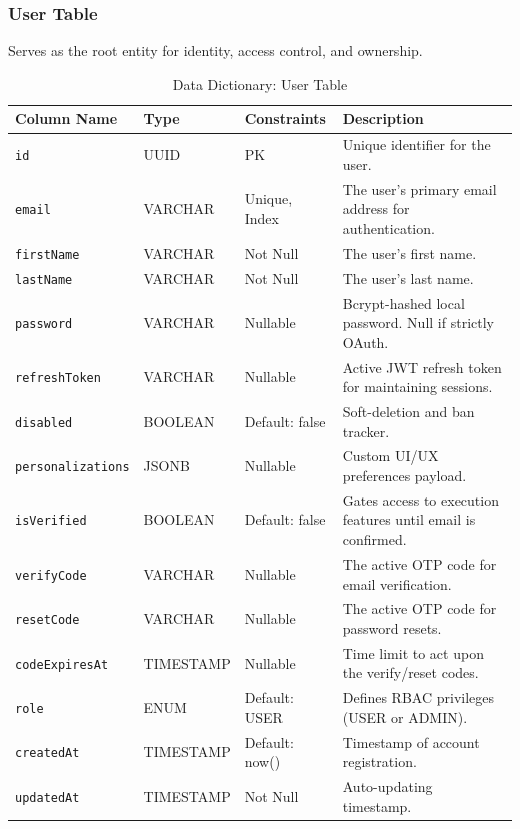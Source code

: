 \subsubsection{User Table}
Serves as the root entity for identity, access control, and ownership.
\begin{table}[H]
\centering
\renewcommand{\arraystretch}{1.3}
\begin{tabularx}{\textwidth}{|l|l|l|X|}
\hline
\textbf{Column Name} & \textbf{Type} & \textbf{Constraints} & \textbf{Description} \\
\hline
\texttt{id} & UUID & PK & Unique identifier for the user. \\
\hline
\texttt{email} & VARCHAR & Unique, Index & The user's primary email address for authentication. \\
\hline
\texttt{firstName} & VARCHAR & Not Null & The user's first name. \\
\hline
\texttt{lastName} & VARCHAR & Not Null & The user's last name. \\
\hline
\texttt{password} & VARCHAR & Nullable & Bcrypt-hashed local password. Null if strictly OAuth. \\
\hline
\texttt{refreshToken} & VARCHAR & Nullable & Active JWT refresh token for maintaining sessions. \\
\hline
\texttt{disabled} & BOOLEAN & Default: false & Soft-deletion and ban tracker. \\
\hline
\texttt{personalizations} & JSONB & Nullable & Custom UI/UX preferences payload. \\
\hline
\texttt{isVerified} & BOOLEAN & Default: false & Gates access to execution features until email is confirmed. \\
\hline
\texttt{verifyCode} & VARCHAR & Nullable & The active OTP code for email verification. \\
\hline
\texttt{resetCode} & VARCHAR & Nullable & The active OTP code for password resets. \\
\hline
\texttt{codeExpiresAt} & TIMESTAMP & Nullable & Time limit to act upon the verify/reset codes. \\
\hline
\texttt{role} & ENUM & Default: USER & Defines RBAC privileges (USER or ADMIN). \\
\hline
\texttt{createdAt} & TIMESTAMP & Default: now() & Timestamp of account registration. \\
\hline
\texttt{updatedAt} & TIMESTAMP & Not Null & Auto-updating timestamp. \\
\hline
\end{tabularx}
\caption{Data Dictionary: User Table}
\label{tab:dict-user}
\end{table}


